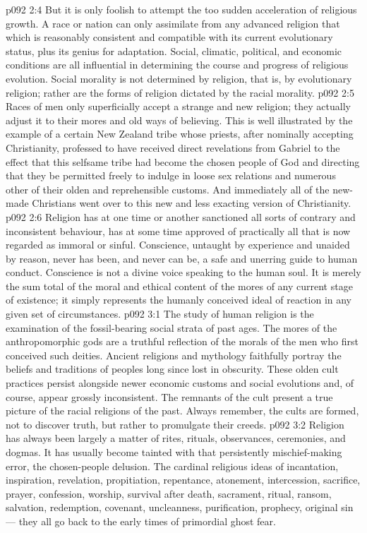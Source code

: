 \vs p092 2:4 But it is only foolish to attempt the too sudden acceleration of religious growth. A race or nation can only assimilate from any advanced religion that which is reasonably consistent and compatible with its current evolutionary status, plus its genius for adaptation. Social, climatic, political, and economic conditions are all influential in determining the course and progress of religious evolution. Social morality is not determined by religion, that is, by evolutionary religion; rather are the forms of religion dictated by the racial morality.
\vs p092 2:5 Races of men only superficially accept a strange and new religion; they actually adjust it to their mores and old ways of believing. This is well illustrated by the example of a certain New Zealand tribe whose priests, after nominally accepting Christianity, professed to have received direct revelations from Gabriel to the effect that this selfsame tribe had become the chosen people of God and directing that they be permitted freely to indulge in loose sex relations and numerous other of their olden and reprehensible customs. And immediately all of the new\hyp{}made Christians went over to this new and less exacting version of Christianity.
\vs p092 2:6 Religion has at one time or another sanctioned all sorts of contrary and inconsistent behaviour, has at some time approved of practically all that is now regarded as immoral or sinful. Conscience, untaught by experience and unaided by reason, never has been, and never can be, a safe and unerring guide to human conduct. Conscience is not a divine voice speaking to the human soul. It is merely the sum total of the moral and ethical content of the mores of any current stage of existence; it simply represents the humanly conceived ideal of reaction in any given set of circumstances.
\vs p092 3:1 The study of human religion is the examination of the fossil\hyp{}bearing social strata of past ages. The mores of the anthropomorphic gods are a truthful reflection of the morals of the men who first conceived such deities. Ancient religions and mythology faithfully portray the beliefs and traditions of peoples long since lost in obscurity. These olden cult practices persist alongside newer economic customs and social evolutions and, of course, appear grossly inconsistent. The remnants of the cult present a true picture of the racial religions of the past. Always remember, the cults are formed, not to discover truth, but rather to promulgate their creeds.
\vs p092 3:2 Religion has always been largely a matter of rites, rituals, observances, ceremonies, and dogmas. It has usually become tainted with that persistently mischief\hyp{}making error, the chosen\hyp{}people delusion. The cardinal religious ideas of incantation, inspiration, revelation, propitiation, repentance, atonement, intercession, sacrifice, prayer, confession, worship, survival after death, sacrament, ritual, ransom, salvation, redemption, covenant, uncleanness, purification, prophecy, original sin --- they all go back to the early times of primordial ghost fear.
